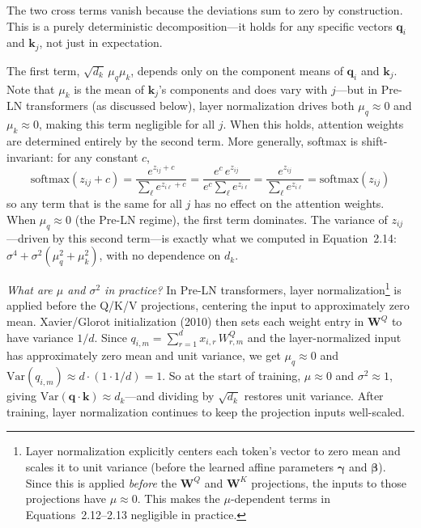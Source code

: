 \begin{notebox}
The two cross terms vanish because the deviations sum to zero by construction. This is a purely deterministic decomposition---it holds for any specific vectors $\mathbf{q}_i$ and $\mathbf{k}_j$, not just in expectation.

The first term, $\sqrt{d_k}\, \mu_q \mu_k$, depends only on the component means of $\mathbf{q}_i$ and $\mathbf{k}_j$. Note that $\mu_k$ is the mean of $\mathbf{k}_j$'s components and does vary with $j$---but in Pre-LN transformers (as discussed below), layer normalization drives both $\mu_q \approx 0$ and $\mu_k \approx 0$, making this term negligible for all $j$. When this holds, attention weights are determined entirely by the second term. More generally, softmax is shift-invariant: for any constant $c$,
\[
\text{softmax}(z_{ij} + c) = \frac{e^{z_{ij}+c}}{\sum_\ell e^{z_{i\ell}+c}} = \frac{e^c\, e^{z_{ij}}}{e^c \sum_\ell e^{z_{i\ell}}} = \frac{e^{z_{ij}}}{\sum_\ell e^{z_{i\ell}}} = \text{softmax}(z_{ij})
\]
so any term that is the same for all $j$ has no effect on the attention weights. When $\mu_q \approx 0$ (the Pre-LN regime), the first term dominates. The variance of $z_{ij}$---driven by this second term---is exactly what we computed in Equation~2.14: $\sigma^4 + \sigma^2(\mu_q^2 + \mu_k^2)$, with no dependence on $d_k$.

\emph{What are $\mu$ and $\sigma^2$ in practice?} In Pre-LN transformers, layer normalization\footnote{Layer normalization explicitly centers each token's vector to zero mean and scales it to unit variance (before the learned affine parameters $\boldsymbol{\gamma}$ and $\boldsymbol{\beta}$). Since this is applied \emph{before} the $\mathbf{W}^Q$ and $\mathbf{W}^K$ projections, the inputs to those projections have $\mu \approx 0$. This makes the $\mu$-dependent terms in Equations~2.12--2.13 negligible in practice.} is applied before the Q/K/V projections, centering the input to approximately zero mean. Xavier/Glorot initialization (2010) then sets each weight entry in $\mathbf{W}^Q$ to have variance $1/d$. Since $q_{i,m} = \sum_{r=1}^{d} x_{i,r}\, W^Q_{r,m}$ and the layer-normalized input has approximately zero mean and unit variance, we get $\mu_q \approx 0$ and $\text{Var}(q_{i,m}) \approx d \cdot (1 \cdot 1/d) = 1$. So at the start of training, $\mu \approx 0$ and $\sigma^2 \approx 1$, giving $\text{Var}(\mathbf{q} \cdot \mathbf{k}) \approx d_k$---and dividing by $\sqrt{d_k}$ restores unit variance. After training, layer normalization continues to keep the projection inputs well-scaled.
\end{notebox}


